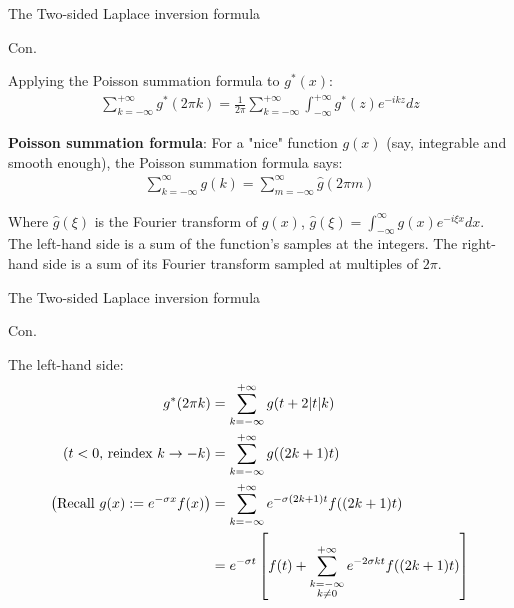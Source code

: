 \documentclass{beamer}
\begin{document}
\begin{frame}{The Two-sided Laplace inversion formula}


    {\footnotesize \scriptsize
    \par Con.
    \par Applying the Poisson summation formula to \( g^*(x) \):
    \begin{align*}
        \sum_{k=-\infty}^{+\infty} g^*(2\pi k) = \frac{1}{2\pi} \sum_{k=-\infty}^{+\infty} \int_{-\infty}^{+\infty} g^*(z)e^{-ikz} dz
    \end{align*}
    \par  \pause \textbf{Poisson summation formula}: For a "nice" function \( g(x) \) (say, integrable and smooth enough), 
    the Poisson summation formula says:
    \begin{align*}
        \sum_{k=-\infty}^{\infty} g(k) = \sum_{m=-\infty}^{\infty} \hat{g}(2\pi m)
    \end{align*}
    \par Where \(\hat{g}(\xi)\) is the Fourier transform of \( g(x)\), $\hat{g}(\xi) = \int_{-\infty}^{\infty} g(x) e^{-i\xi x} dx.$  
    The left-hand side is a sum of the function's samples at the integers.  
    The right-hand side is a sum of its Fourier transform sampled at multiples of \( 2\pi \).
    }
    
\end{frame}
\begin{frame}{The Two-sided Laplace inversion formula}


    {\footnotesize \scriptsize
    \par Con.
    \par The left-hand side:
    \begin{align*}
        g^*(2\pi k) & = \sum_{k=-\infty}^{+\infty} g(t + 2|t|k) \\
        \left(\text{$t<0$, reindex $k \rightarrow -k$}\right)&= \sum_{k=-\infty}^{+\infty} g((2k + 1)t)\\
        \left(\text{Recall \( g(x) := e^{-\sigma x} f(x) \)}\right)&=\sum_{k=-\infty}^{+\infty} e^{-\sigma(2k+1)t} f((2k + 1)t)\\
        & = e^{-\sigma t} \left[ f(t) + \sum_{\substack{k=-\infty \\ k\neq 0}}^{+\infty} e^{-2\sigma kt} f((2k + 1)t) \right]
    \end{align*}
    }
    
\end{frame}
\end{document}

